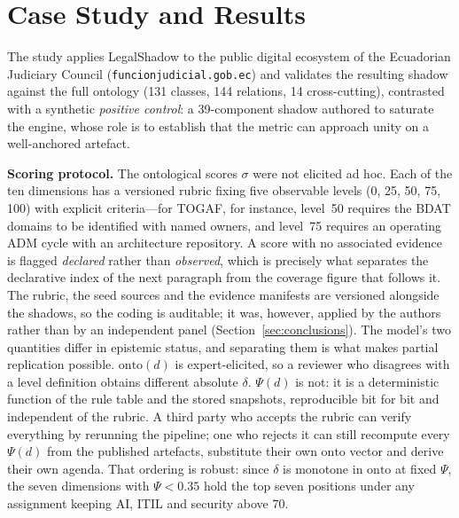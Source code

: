 \documentclass[engproc,proceedingpaper,submit,moreauthors]{Definitions/mdpi}
\begin{document}
\section{Case Study and Results}
\label{sec:results}

The study applies LegalShadow to the public digital ecosystem of the Ecuadorian Judiciary Council (\texttt{funcionjudicial\-.gob\-.ec}) and validates the resulting shadow against the full ontology (131 classes, 144 relations, 14 cross-cutting), contrasted with a synthetic \emph{positive control}: a 39-component shadow authored to saturate the engine, whose role is to establish that the metric can approach unity on a well-anchored artefact.

\textbf{Scoring protocol.} The ontological scores $\sigma$ were not elicited ad hoc. Each of the ten dimensions has a versioned rubric fixing five observable levels (0, 25, 50, 75, 100) with explicit criteria---for TOGAF, for instance, level~50 requires the BDAT domains to be identified with named owners, and level~75 requires an operating ADM cycle with an architecture repository. A score with no associated evidence is flagged \emph{declared} rather than \emph{observed}, which is precisely what separates the declarative index of the next paragraph from the coverage figure that follows it. The rubric, the seed sources and the evidence manifests are versioned alongside the shadows, so the coding is auditable; it was, however, applied by the authors rather than by an independent panel (Section~\ref{sec:conclusions}).
The model's two quantities differ in epistemic status, and separating them is what makes partial replication possible. $\mathrm{onto}(d)$ is expert-elicited, so a reviewer who disagrees with a level definition obtains different absolute $\delta$. $\Psi(d)$ is not: it is a deterministic function of the rule table and the stored snapshots, reproducible bit for bit and independent of the rubric. A third party who accepts the rubric can verify everything by rerunning the pipeline; one who rejects it can still recompute every $\Psi(d)$ from the published artefacts, substitute their own $\mathrm{onto}$ vector and derive their own agenda. That ordering is robust: since $\delta$ is monotone in $\mathrm{onto}$ at fixed $\Psi$, the seven dimensions with $\Psi<0.35$ hold the top seven positions under any assignment keeping AI, ITIL and security above 70.
\end{document}
